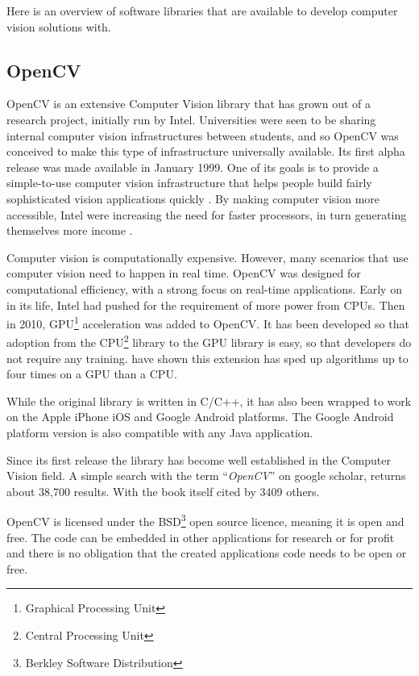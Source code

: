 \documentclass[11pt,oneside]{report}
\begin{document}
					Here is an overview of software libraries that are available to develop computer vision solutions with.
					
					\subsection{OpenCV}
						OpenCV is an extensive Computer Vision library that has grown out of a research project, initially run by Intel.
				Universities were seen to be sharing internal computer vision infrastructures between students, and so OpenCV was conceived to make this type of infrastructure universally available.
				Its first alpha release was made available in January 1999.
				One of its goals is to provide a simple-to-use computer vision infrastructure that helps people build fairly sophisticated vision applications quickly \cite[p. 1]{definition:cv}.	
				By making computer vision more accessible, Intel were increasing the need for faster processors, in turn generating themselves more income \cite{definition:cv}.
				
				Computer vision is computationally expensive.
				However, many scenarios that use computer vision need to happen in real time.
				OpenCV was designed for computational efficiency, with a strong focus on real-time applications.
				Early on in its life, Intel had pushed for the requirement of more power from CPUs.
				Then in 2010, GPU\footnote{Graphical Processing Unit} acceleration was added to OpenCV.
				It has been developed so that adoption from the CPU\footnote{Central Processing Unit} library to the GPU library is easy, so that developers do not require any training.
				 have shown this extension has sped up algorithms up to four times on a GPU than a CPU.
				
				While the original library is written in C/C++, it has also been wrapped to work on the Apple iPhone iOS and Google Android platforms.
				The Google Android platform version is also compatible with any Java application.
								
				Since its first release the library has become well established in the Computer Vision field.
				A simple search with the term ``\textit{OpenCV}'' on google scholar, returns about 38,700 results.
				With the  book itself cited by 3409 others.
				
				OpenCV is licensed under the BSD\footnote{Berkley Software Distribution} open source licence, meaning it is open and free.
				The code can be embedded in other applications for research or for profit and there is no obligation that the created applications code needs to be open or free.
\end{document}
